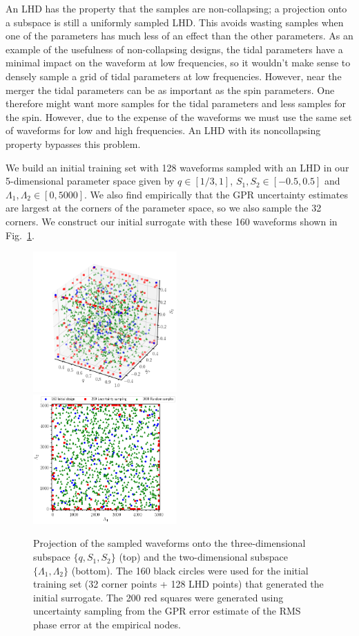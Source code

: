 \documentclass[prd,aps,letter,twocolumn,floatfix,notitlepage,nofootinbib]{revtex4-1}
\begin{document}
An LHD has the property that the samples are non-collapsing; a projection onto a subspace is still a uniformly sampled LHD. This avoids wasting samples when one of the parameters has much less of an effect than the other parameters. As an example of the usefulness of non-collapsing designs, the tidal parameters have a minimal impact on the waveform at low frequencies, so it wouldn't make sense to densely sample a grid of tidal parameters at low frequencies. However, near the merger the tidal parameters can be as important as the spin parameters. One therefore might want more samples for the tidal parameters and less samples for the spin. However, due to the expense of the waveforms we must use the same set of waveforms for low and high frequencies. An LHD with its noncollapsing property bypasses this problem. 

We build an initial training set with 128 waveforms sampled with an LHD in our 5-dimensional parameter space given by $q\in[1/3, 1]$, $S_1, S_2 \in [-0.5, 0.5]$ and $\Lambda_1, \Lambda_2 \in [0, 5000]$. We also find empirically that the GPR uncertainty estimates are largest at the corners of the parameter space, so we also sample the 32 corners. We construct our initial surrogate with these 160 waveforms shown in Fig.~\ref{fig:LHD}.

\begin{figure}[htb]
\centering
\includegraphics[width=0.49\textwidth]{trainingset3d.png}\\
\includegraphics[width=0.49\textwidth]{trainingset2d.png}
\caption{Projection of the sampled waveforms onto the three-dimensional subspace $\{q, S_1, S_2\}$ (top)
and the two-dimensional subspace $\{\Lambda_1, \Lambda_2\}$ (bottom). The 160 black circles were used for the initial
training set (32 corner points + 128 LHD points) that generated the initial surrogate. The 200 red squares were generated
using uncertainty sampling from the GPR error estimate of the RMS phase error at the empirical nodes. 
}
\label{fig:LHD}
\end{figure}
\end{document}
